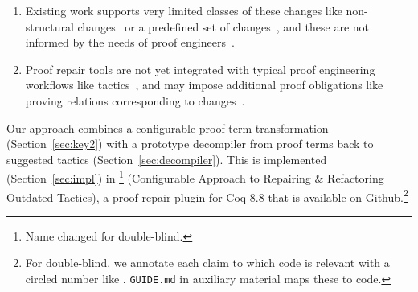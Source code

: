 \begin{enumerate}
\item Existing work supports very limited classes of these changes like non-structural changes~\cite{pumpkinpatch} or a predefined set
of changes~\cite{robert2018, wibergh2019}, and these are not informed by the needs of proof engineers~\cite{replica}.
\item Proof repair tools are not yet integrated with typical proof engineering workflows like tactics~\cite{PGL-045, pumpkinpatch, robert2018},
and may impose additional proof obligations like proving relations corresponding to changes~\cite{Ringer2019}.
\end{enumerate}
%

Our approach combines a configurable proof term transformation (Section~\ref{sec:key2}) with a prototype decompiler from proof terms
back to suggested tactics (Section~\ref{sec:decompiler}). %
This is implemented (Section~\ref{sec:impl}) in \toolname\footnote{Name changed for double-blind.} (Configurable Approach to Repairing \& Refactoring Outdated Tactics), a proof repair plugin for Coq 8.8 that is available on Github.\footnote{For double-blind, we annotate each claim to which code is relevant with a circled number like . \lstinline{GUIDE.md} in auxiliary material maps these to code.}


